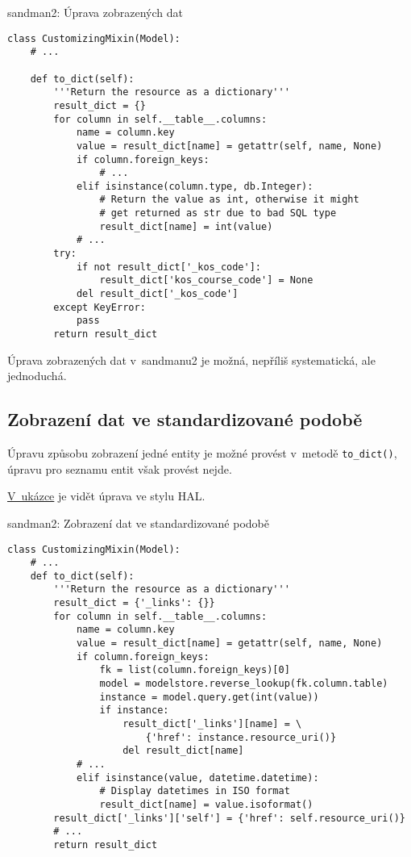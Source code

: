 \begin{listing}[htbp]
\caption{{\label{code:sandman2:modify}sandman2: Úprava zobrazených dat}}
\begin{verbatim}
class CustomizingMixin(Model):
    # ...

    def to_dict(self):
        '''Return the resource as a dictionary'''
        result_dict = {}
        for column in self.__table__.columns:
            name = column.key
            value = result_dict[name] = getattr(self, name, None)
            if column.foreign_keys:
                # ...
            elif isinstance(column.type, db.Integer):
                # Return the value as int, otherwise it might
                # get returned as str due to bad SQL type
                result_dict[name] = int(value)
            # ...
        try:
            if not result_dict['_kos_code']:
                result_dict['kos_course_code'] = None
            del result_dict['_kos_code']
        except KeyError:
            pass
        return result_dict
\end{verbatim}
\end{listing}

Úprava zobrazených dat v~sandmanu2 je možná, nepříliš systematická, ale jednoduchá.

\subsection{Zobrazení dat ve standardizované podobě}\label{zobrazenuxed-dat-ve-standardizovanuxe9-podobux11b}

Úpravu způsobu zobrazení jedné entity je možné provést v~metodě \verb!to_dict()!, úpravu pro seznamu entit však provést nejde.

\protect\hyperlink{code:sandman2:standard}{V~ukázce} je vidět úprava ve stylu HAL.

\begin{listing}[htbp]
\caption{{\label{code:sandman2:standard}sandman2: Zobrazení dat ve standardizované podobě}}
\begin{verbatim}
class CustomizingMixin(Model):
    # ...
    def to_dict(self):
        '''Return the resource as a dictionary'''
        result_dict = {'_links': {}}
        for column in self.__table__.columns:
            name = column.key
            value = result_dict[name] = getattr(self, name, None)
            if column.foreign_keys:
                fk = list(column.foreign_keys)[0]
                model = modelstore.reverse_lookup(fk.column.table)
                instance = model.query.get(int(value))
                if instance:
                    result_dict['_links'][name] = \
                        {'href': instance.resource_uri()}
                    del result_dict[name]
            # ...
            elif isinstance(value, datetime.datetime):
                # Display datetimes in ISO format
                result_dict[name] = value.isoformat()
        result_dict['_links']['self'] = {'href': self.resource_uri()}
        # ...
        return result_dict
\end{verbatim}
\end{listing}

